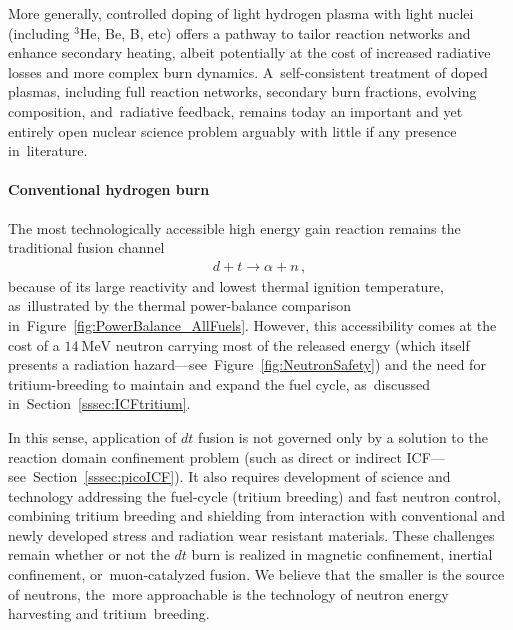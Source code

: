 \documentclass[particles,article,accept,pdftex,moreauthors]{Definitions/mdpi}
\begin{document}
More generally, controlled doping of light hydrogen plasma with light nuclei (including ${}^3$He, Be, B, etc) offers a pathway to tailor reaction networks and enhance secondary heating, albeit potentially at the cost of increased radiative losses and more complex burn dynamics. A~self-consistent treatment of doped plasmas, including full reaction networks, secondary burn fractions, evolving composition, and~radiative feedback, remains today an important and yet entirely open nuclear science problem arguably with little if any presence in~literature.

\vspace{-6pt}\paragraph*{\bf Conventional hydrogen burn}
The most technologically accessible high energy gain reaction remains the traditional fusion channel
\begin{align}
 d+t\to \alpha+n\,,
\end{align}
because of its large reactivity and lowest thermal ignition temperature, as~illustrated by the thermal power-balance comparison in~Figure~\ref{fig:PowerBalance_AllFuels}. However, this accessibility comes at the cost of a $14~\mathrm{MeV}$ neutron carrying most of the released energy (which itself presents a radiation hazard---see~Figure~\ref{fig:NeutronSafety}) and the need for tritium-breeding to maintain and expand the fuel cycle, as~discussed in~Section~\ref{sssec:ICFtritium}. 

In this sense, application of $dt$ fusion is not governed only by a solution to the reaction domain confinement problem (such as direct or indirect ICF---see~Section~\ref{sssec:picoICF}). It also requires development of science and technology addressing the fuel-cycle (tritium breeding) and fast neutron control, combining tritium breeding and shielding from interaction with conventional and newly developed stress and radiation wear resistant materials. These challenges remain whether or not the $dt$ burn is realized in magnetic confinement, inertial confinement, or~muon-catalyzed fusion. We believe that the smaller is the source of neutrons, the~more approachable is the technology of neutron energy harvesting and tritium~breeding.
\end{document}
